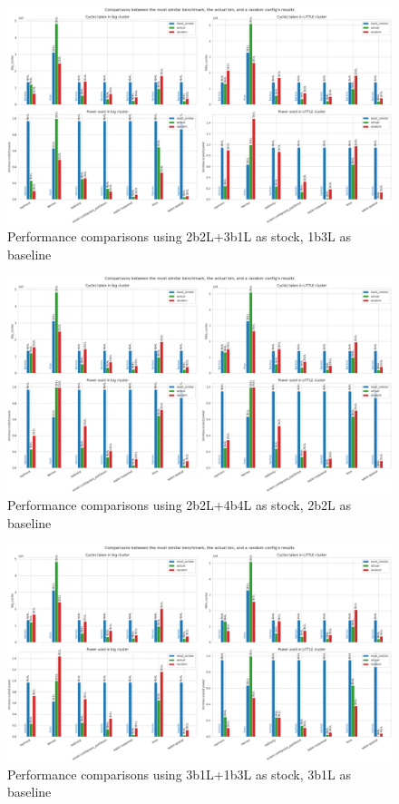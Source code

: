 \begin{figure}[H]
    \centering
    \includegraphics[height=0.4\textheight]{pred-plots/stock-2b2L-3b1L/rand-1b3L.png}
    \caption{Performance comparisons using 2b2L+3b1L as stock, 1b3L as baseline}
\end{figure}

\begin{figure}[H]
    \centering
    \includegraphics[height=0.4\textheight]{pred-plots/stock-2b2L-4b4L/rand-2b2L.png}
    \caption{Performance comparisons using 2b2L+4b4L as stock, 2b2L as baseline}
\end{figure}

\begin{figure}[H]
    \centering
    \includegraphics[height=0.4\textheight]{pred-plots/stock-3b1L-1b3L/rand-3b1L.png}
    \caption{Performance comparisons using 3b1L+1b3L as stock, 3b1L as baseline}
\end{figure}

